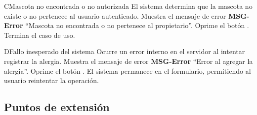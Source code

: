   \begin{UCtrayectoriaA}{C}{Mascota no encontrada o no autorizada}
      \UCpaso El sistema determina que la mascota no existe o no pertenece al usuario autenticado.
      \UCpaso Muestra el mensaje de error {\bf MSG-Error} ``Mascota no encontrada o no pertenece al propietario''.
      \UCpaso[\UCactor] Oprime el botón .
      \UCpaso[] Termina el caso de uso.
  \end{UCtrayectoriaA}
  
  \begin{UCtrayectoriaA}{D}{Fallo inesperado del sistema}
      \UCpaso Ocurre un error interno en el servidor al intentar registrar la alergia.
      \UCpaso Muestra el mensaje de error {\bf MSG-Error} ``Error al agregar la alergia''.
      \UCpaso[\UCactor] Oprime el botón .
      \UCpaso[] El sistema permanece en el formulario, permitiendo al usuario reintentar la operación.
  \end{UCtrayectoriaA}
  
  \subsection{Puntos de extensión}
